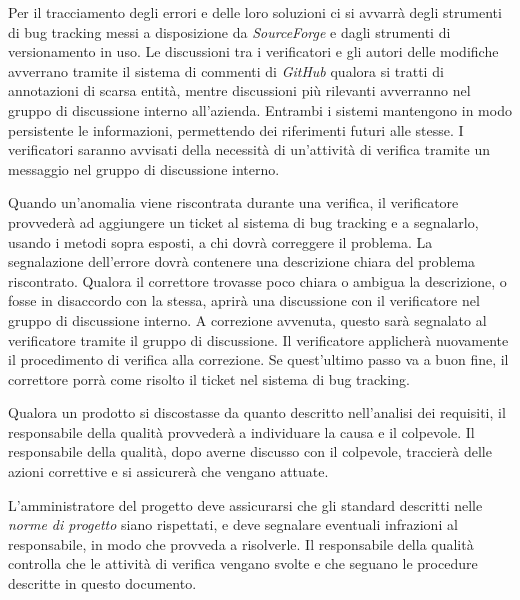 Per il tracciamento degli errori e delle loro soluzioni ci si avvarr\`a degli strumenti di bug tracking messi a disposizione da \textit{SourceForge} e dagli strumenti di versionamento in uso.
Le discussioni tra i verificatori e gli autori delle modifiche avverrano tramite il sistema di commenti di \textit{GitHub} qualora si tratti di annotazioni di scarsa entit\`a, mentre discussioni pi\`u rilevanti avverranno nel gruppo di discussione interno all'azienda. Entrambi i sistemi mantengono in modo persistente le informazioni, permettendo dei riferimenti futuri alle stesse. I verificatori saranno avvisati della necessit\`a di un'attivit\`a di verifica tramite un messaggio nel gruppo di discussione interno. 



Quando un'anomalia viene riscontrata durante una verifica, il verificatore provveder\`a ad aggiungere un ticket al sistema di bug tracking e a segnalarlo, usando i metodi sopra esposti, a chi dovr\`a correggere il problema. La segnalazione dell'errore dovr\`a contenere una descrizione chiara del problema riscontrato. Qualora il correttore trovasse poco chiara o ambigua la descrizione, o fosse in disaccordo con la stessa, aprir\`a una discussione con il verificatore nel gruppo di discussione interno. A correzione avvenuta, questo sar\`a segnalato al verificatore tramite il gruppo di discussione. Il verificatore applicher\`a nuovamente il procedimento di verifica alla correzione. Se quest'ultimo passo va a buon fine, il correttore porr\`a come risolto il ticket nel sistema di bug tracking.

Qualora un prodotto si discostasse da quanto descritto nell'analisi dei requisiti, il responsabile della qualit\`a provveder\`a a individuare la causa e il colpevole. Il responsabile della qualit\`a, dopo averne discusso con il colpevole, traccier\`a delle azioni correttive e si assicurer\`a che vengano attuate.

L'amministratore del progetto deve assicurarsi che gli standard descritti nelle \textit{norme di progetto} siano rispettati, e deve segnalare eventuali infrazioni al responsabile, in modo che provveda a risolverle. Il responsabile della qualit\`a controlla che le attivit\`a di verifica vengano svolte e che seguano le procedure descritte in questo documento.








